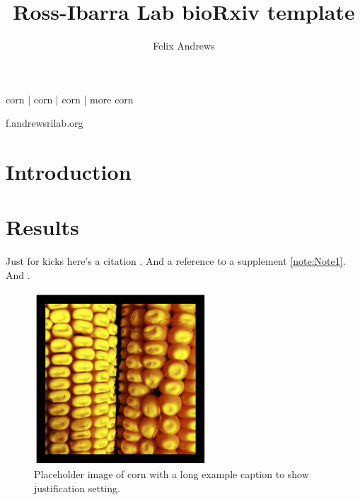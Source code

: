 \documentclass[times,twoside,watermark]{rilab}
\begin{document}
\title{Ross-Ibarra Lab bioRxiv template}

\author[1,\Letter]{Felix Andrews}


\maketitle

\begin{abstract}
\lipsum[1-1]
\end {abstract}

\begin{keywords}
corn | corn | corn | more corn
\end{keywords}

\begin{corrauthor}
f.andrews\at rilab.org
\end{corrauthor}

\section*{Introduction}
\lipsum[1-4]

\section*{Results}
\lipsum[3-5]

Just for kicks here's a citation \citep{Gustafsson2016}. And a reference to a supplement \cref{note:Note1}. And .


\begin{figure}%
\centering
\includegraphics[width=.8\linewidth]{Figures/corn.jpg}
\caption{Placeholder image of corn with a long example caption to show justification setting.}
\label{fig:computerNo}
\end{figure}
\end{document}
